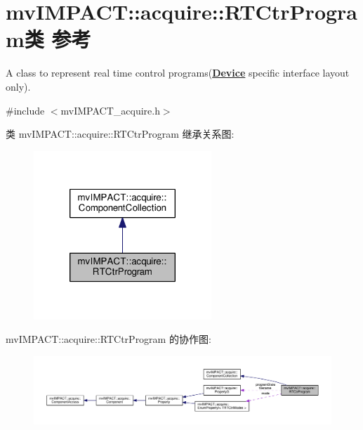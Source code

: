 \hypertarget{classmv_i_m_p_a_c_t_1_1acquire_1_1_r_t_ctr_program}{\section{mv\+I\+M\+P\+A\+C\+T\+:\+:acquire\+:\+:R\+T\+Ctr\+Program类 参考}
\label{classmv_i_m_p_a_c_t_1_1acquire_1_1_r_t_ctr_program}
}


A class to represent real time control programs({\bfseries \hyperlink{classmv_i_m_p_a_c_t_1_1acquire_1_1_device}{Device}} specific interface layout only).  




{\ttfamily \#include $<$mv\+I\+M\+P\+A\+C\+T\+\_\+acquire.\+h$>$}



类 mv\+I\+M\+P\+A\+C\+T\+:\+:acquire\+:\+:R\+T\+Ctr\+Program 继承关系图\+:
\nopagebreak
\begin{figure}[H]
\begin{center}
\leavevmode
\includegraphics[width=190pt]{classmv_i_m_p_a_c_t_1_1acquire_1_1_r_t_ctr_program__inherit__graph}
\end{center}
\end{figure}


mv\+I\+M\+P\+A\+C\+T\+:\+:acquire\+:\+:R\+T\+Ctr\+Program 的协作图\+:
\nopagebreak
\begin{figure}[H]
\begin{center}
\leavevmode
\includegraphics[width=350pt]{classmv_i_m_p_a_c_t_1_1acquire_1_1_r_t_ctr_program__coll__graph}
\end{center}
\end{figure}
